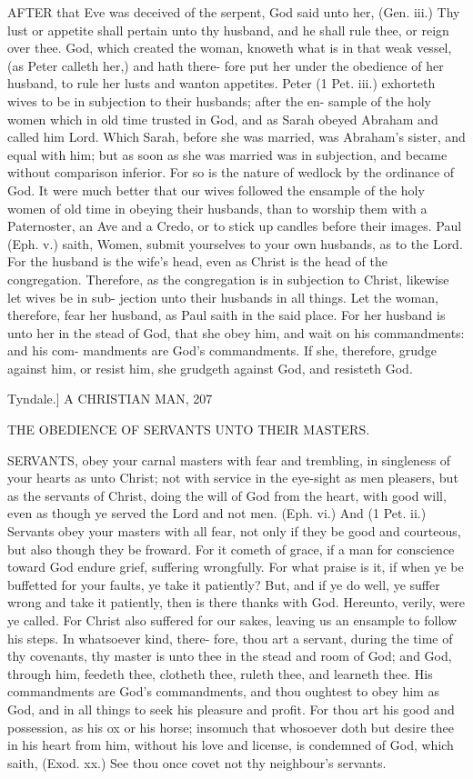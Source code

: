 \documentclass{custom}
\begin{document}
AFTER that Eve was deceived of the serpent, God said 
unto her, (Gen. iii.) Thy lust or appetite shall pertain 
unto thy husband, and he shall rule thee, or reign over
thee. God, which created the woman, knoweth what is
in that weak vessel, (as Peter calleth her,) and hath there- 
fore put her under the obedience of her husband, to rule her 
lusts and wanton appetites. Peter (1 Pet. iii.) exhorteth 
wives to be in subjection to their husbands; after the en- 
sample of the holy women which in old time trusted in 
God, and as Sarah obeyed Abraham and called him 
Lord. Which Sarah, before she was married, was
Abraham's sister, and equal with him; but as 
soon as she was married was in subjection, and became 
without comparison inferior. For so is the nature of 
wedlock by the ordinance of God. It were much better 
that our wives followed the ensample of the holy women of 
old time in obeying their husbands, than to worship them 
with a Paternoster, an Ave and a Credo, or to stick up 
candles before their images. Paul (Eph. v.) saith, Women, 
submit yourselves to your own husbands, as to the
Lord. For the husband is the wife's head, even as Christ is 
the head of the congregation. Therefore, as the congregation 
is in subjection to Christ, likewise let wives be in sub-
jection unto their husbands in all things. Let the woman, 
therefore, fear her husband, as Paul saith in the said place. 
For her husband is unto her in the stead of God, that she 
obey him, and wait on his commandments: and his com- 
mandments are God's commandments. If she, therefore, 
grudge against him, or resist him, she grudgeth against 
God, and resisteth God.


Tyndale.] 
A CHRISTIAN MAN, 
207 

THE OBEDIENCE OF SERVANTS UNTO THEIR 
MASTERS. 

SERVANTS, obey your carnal masters with fear and 
trembling, in singleness of your hearts as unto Christ;
not with service in the eye-sight as men pleasers, but as 
the servants of Christ, doing the will of God from the 
heart, with good will, even as though ye served the Lord 
and not men. (Eph. vi.) And (1 Pet. ii.) Servants obey 
your masters with all fear, not only if they be good and 
courteous, but also though they be froward. For it cometh 
of grace, if a man for conscience toward God endure 
grief, suffering wrongfully. For what praise is it, if when 
ye be buffetted for your faults, ye take it patiently? But, 
and if ye do well, ye suffer wrong and take it patiently, 
then is there thanks with God. Hereunto, verily, were ye 
called. For Christ also suffered for our sakes, leaving us 
an ensample to follow his steps. In whatsoever kind, there- 
fore, thou art a servant, during the time of thy covenants, 
thy master is unto thee in the stead and room of God;
and God, through him, feedeth thee, clotheth thee, ruleth 
thee, and learneth thee. His commandments are God's 
commandments, and thou oughtest to obey him as God, 
and in all things to seek his pleasure and profit. For 
thou art his good and possession, as his ox or his horse;
insomuch that whosoever doth but desire thee in his heart 
from him, without his love and license, is condemned of 
God, which saith, (Exod. xx.) See thou once covet not 
thy neighbour's servants. 
\end{document}
